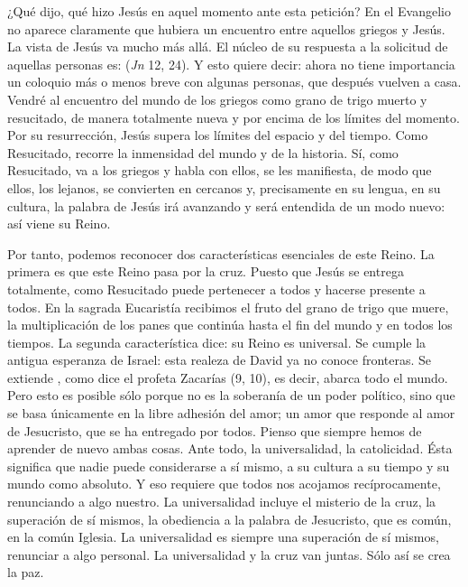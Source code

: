 \begin{body}
¿Qué dijo, qué hizo Jesús en aquel momento ante esta petición? En el Evangelio no aparece claramente que hubiera un encuentro entre aquellos griegos y Jesús. La vista de Jesús va mucho más allá. El núcleo de su respuesta a la solicitud de aquellas personas es:  (\textit{Jn} 12, 24). Y esto quiere decir: ahora no tiene importancia un coloquio más o menos breve con algunas personas, que después vuelven a casa. Vendré al encuentro del mundo de los griegos como grano de trigo muerto y resucitado, de manera totalmente nueva y por encima de los límites del momento. Por su resurrección, Jesús supera los límites del espacio y del tiempo. Como Resucitado, recorre la inmensidad del mundo y de la historia. Sí, como Resucitado, va a los griegos y habla con ellos, se les manifiesta, de modo que ellos, los lejanos, se convierten en cercanos y, precisamente en su lengua, en su cultura, la palabra de Jesús irá avanzando y será entendida de un modo nuevo: así viene su Reino. 

Por tanto, podemos reconocer dos características esenciales de este Reino. La primera es que este Reino pasa por la cruz. Puesto que Jesús se entrega totalmente, como Resucitado puede pertenecer a todos y hacerse presente a todos. En la sagrada Eucaristía recibimos el fruto del grano de trigo que muere, la multiplicación de los panes que continúa hasta el fin del mundo y en todos los tiempos. La segunda característica dice: su Reino es universal. Se cumple la antigua esperanza de Israel: esta realeza de David ya no conoce fronteras. Se extiende , como dice el profeta Zacarías (9, 10), es decir, abarca todo el mundo. Pero esto es posible sólo porque no es la soberanía de un poder político, sino que se basa únicamente en la libre adhesión del amor; un amor que responde al amor de Jesucristo, que se ha entregado por todos. Pienso que siempre hemos de aprender de nuevo ambas cosas. Ante todo, la universalidad, la catolicidad. Ésta significa que nadie puede considerarse a sí mismo, a su cultura a su tiempo y su mundo como absoluto. Y eso requiere que todos nos acojamos recíprocamente, renunciando a algo nuestro. La universalidad incluye el misterio de la cruz, la superación de sí mismos, la obediencia a la palabra de Jesucristo, que es común, en la común Iglesia. La universalidad es siempre una superación de sí mismos, renunciar a algo personal. La universalidad y la cruz van juntas. Sólo así se crea la paz.


\end{body}
